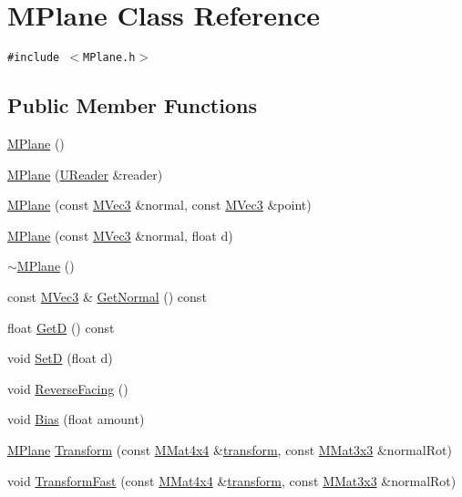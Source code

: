 \hypertarget{class_m_plane}{
\section{MPlane Class Reference}
\label{class_m_plane}
}
{\tt \#include $<$MPlane.h$>$}

\subsection*{Public Member Functions}
\begin{CompactItemize}
\item 
\hyperlink{class_m_plane_05f80146f7924ba17f387847ad4562a6}{MPlane} ()
\item 
\hyperlink{class_m_plane_4284b8ea0623a916fab4a8d8dc7309b2}{MPlane} (\hyperlink{class_u_reader}{UReader} \&reader)
\item 
\hyperlink{class_m_plane_28191a178c76b234747571d819b71cf5}{MPlane} (const \hyperlink{class_m_vec3}{MVec3} \&normal, const \hyperlink{class_m_vec3}{MVec3} \&point)
\item 
\hyperlink{class_m_plane_6195235398e2dd4ef5d0614c0f08b517}{MPlane} (const \hyperlink{class_m_vec3}{MVec3} \&normal, float d)
\item 
\hyperlink{class_m_plane_5c9992f6d3f481962e666995a7cc4198}{$\sim$MPlane} ()
\item 
const \hyperlink{class_m_vec3}{MVec3} \& \hyperlink{class_m_plane_a467926800c24aad63d84af773ee61ba}{GetNormal} () const 
\item 
float \hyperlink{class_m_plane_5d577b90d83e5c9aab6d221cd9d8bda1}{GetD} () const 
\item 
void \hyperlink{class_m_plane_504ba7ba959fbbdcfc13bda9a3c59fff}{SetD} (float d)
\item 
void \hyperlink{class_m_plane_8fc4ab464ff88f145337b33e8c3d3dd0}{ReverseFacing} ()
\item 
void \hyperlink{class_m_plane_d04872aec9db1ff0a6625fac675783ad}{Bias} (float amount)
\item 
\hyperlink{class_m_plane}{MPlane} \hyperlink{class_m_plane_a57251c5e40213bcd468e3c9fe5c39e9}{Transform} (const \hyperlink{class_m_mat4x4}{MMat4x4} \&\hyperlink{glext__bak_8h_07993c0d92c1aeeb357ba0495c8b5325}{transform}, const \hyperlink{class_m_mat3x3}{MMat3x3} \&normalRot)
\item 
void \hyperlink{class_m_plane_11f678fce27735113c0c921508534103}{TransformFast} (const \hyperlink{class_m_mat4x4}{MMat4x4} \&\hyperlink{glext__bak_8h_07993c0d92c1aeeb357ba0495c8b5325}{transform}, const \hyperlink{class_m_mat3x3}{MMat3x3} \&normalRot)

\end{CompactItemize}
